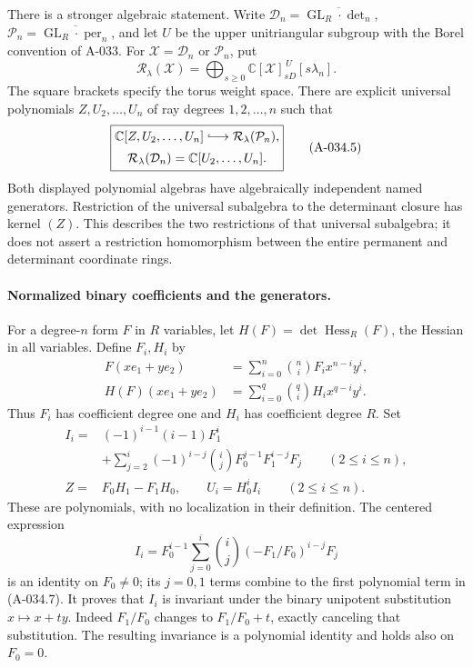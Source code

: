 There is a stronger algebraic statement. Write
\(\mathcal D_n=\overline{\operatorname{GL}_R\cdot\det_n}\),
\(\mathcal P_n=\overline{\operatorname{GL}_R\cdot\operatorname{per}_n}\),
and let \(U\) be the upper unitriangular subgroup with the
Borel convention of A-033. For \(\mathcal X=\mathcal D_n\)
or \(\mathcal P_n\), put
\[
 \mathcal R_\lambda(\mathcal X)
 =\bigoplus_{s\geq0}
       \mathbb C[\mathcal X]_{sD}^{\,U}[s\lambda_n].
                                                               \tag{A-034.4}
\]
The square brackets specify the torus weight space.
There are explicit universal polynomials \(Z,U_2,\ldots,U_n\)
of ray degrees \(1,2,\ldots,n\) such that
\[
 \boxed{\begin{gathered}
 \mathbb C[Z,U_2,\ldots,U_n]
       \lhook\joinrel\longrightarrow \mathcal R_\lambda(\mathcal P_n),
 \\[2pt]
 \mathcal R_\lambda(\mathcal D_n)
                         =\mathbb C[U_2,\ldots,U_n].
 \end{gathered}}                                                \tag{A-034.5}
\]
Both displayed polynomial algebras have algebraically
independent named generators. Restriction of the universal
subalgebra to the determinant closure has kernel \((Z)\).
This describes the two restrictions of that universal
subalgebra; it does not assert a restriction homomorphism
between the entire permanent and determinant coordinate rings.

\paragraph{Normalized binary coefficients and the generators.}
For a degree-\(n\) form \(F\) in \(R\) variables, let
\(H(F)=\det\operatorname{Hess}_{R}(F)\), the Hessian in all
variables. Define \(F_i,H_i\) by
\[
 \begin{split}
 F(xe_1+ye_2)&=\sum_{i=0}^n\binom ni F_i x^{n-i}y^i,\\
 H(F)(xe_1+ye_2)&=\sum_{i=0}^q\binom qi H_i x^{q-i}y^i.
 \end{split}
                                                               \tag{A-034.6}
\]
Thus \(F_i\) has coefficient degree one and \(H_i\) has
coefficient degree \(R\). Set
\[
 \begin{split}
 I_i={}&(-1)^{i-1}(i-1)F_1^i\\
       &+\sum_{j=2}^i(-1)^{i-j}\binom ij
                    F_0^{j-1}F_1^{i-j}F_j
                    \qquad(2\leq i\leq n),\\
 Z={}&F_0H_1-F_1H_0,\qquad
 U_i=H_0^i I_i\qquad(2\leq i\leq n).
 \end{split}                                                   \tag{A-034.7}
\]
These are polynomials, with no localization in their
definition. The centered expression
\[
 I_i=F_0^{i-1}
       \sum_{j=0}^i\binom ij(-F_1/F_0)^{i-j}F_j
                                                               \tag{A-034.8}
\]
is an identity on \(F_0\ne0\); its \(j=0,1\) terms combine
to the first polynomial term in (A-034.7).
It proves that \(I_i\) is invariant under the binary
unipotent substitution \(x\mapsto x+t y\).
Indeed \(F_1/F_0\) changes to \(F_1/F_0+t\), exactly
canceling that substitution. The resulting invariance is
a polynomial identity and holds also on \(F_0=0\).

